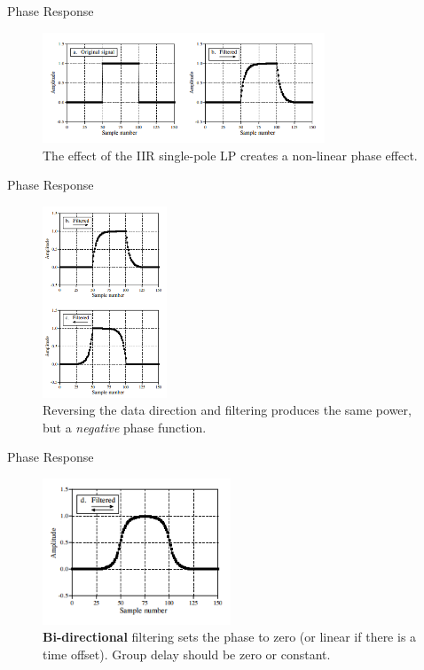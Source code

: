 \documentclass{beamer}
\begin{document}
\begin{frame}{Phase Response}
\small
\begin{figure}
\centering
\includegraphics[width=0.75\textwidth]{figures/phase2.png}
\caption{\label{fig:phase2} The effect of the IIR single-pole LP creates a non-linear phase effect.}
\end{figure}
\end{frame}

\begin{frame}{Phase Response}
\small
\begin{figure}
\centering
\includegraphics[width=0.33\textwidth]{figures/phase3.png}
\caption{\label{fig:phase3} Reversing the data direction and filtering produces the same power, but a \textit{negative} phase function.}
\end{figure}
\end{frame}

\begin{frame}{Phase Response}
\small
\begin{figure}
\centering
\includegraphics[width=0.5\textwidth]{figures/phase4.png}
\caption{\label{fig:phase4} \textbf{Bi-directional} filtering sets the phase to zero (or linear if there is a time offset).  Group delay should be zero or constant.}
\end{figure}
\end{frame}
\end{document}
